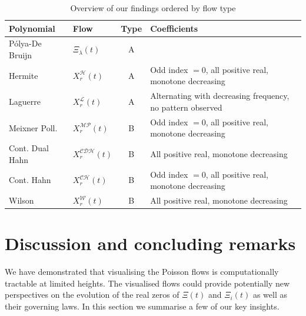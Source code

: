 \documentclass[a4paper,11pt,twoside]{amsart}
\begin{document}
\begin{table}[H]
  \begin{center}
    \caption{Overview of our findings ordered by flow type }
    \label{tab:tablefindings}
    \begin{tabular}{l|l|c|l|} 
      Polynomial & Flow & Type & Coefficients\\
      \hline
      Pólya-De Bruijn & $\Xi_{\lambda}(t)$ & A\\
      Hermite & $X^\mathcal{H}_r(t)$  & A & Odd index $= 0$, all positive real, monotone decreasing\\
      Laguerre & $X^\mathcal{L}_r(t)$  & A & Alternating with decreasing frequency, no pattern observed\\
      Meixner Poll. & $X^\mathcal{MP}_r(t)$  & B & Odd index $= 0$, all positive real, monotone decreasing\\
      Cont. Dual Hahn & $X^\mathcal{CDH}_r(t)$  & B & All positive real, monotone decreasing\\
      Cont. Hahn & $X^\mathcal{CH}_r(t)$  & B & Odd index $= 0$, all positive real, monotone decreasing\\
      Wilson & $X^\mathcal{W}_r(t)$  & B & All positive real, monotone decreasing\\
    \end{tabular}
  \end{center}
\end{table}


\section{Discussion and concluding remarks}\label{concremarks}

We have demonstrated that visualising the Poisson flows is computationally tractable at limited heights. The visualised flows could provide potentially new perspectives on the evolution of the real zeros of $\Xi(t)$ and $\Xi_i(t)$ as well as their governing laws. In this section we summarise a few of our key insights.
 
\end{document}
